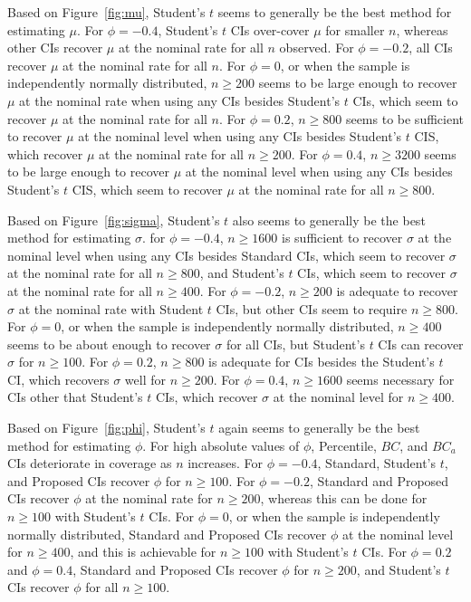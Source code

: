 \documentclass[12pt, letterpaper, titlepage]{article}
\begin{document}
Based on Figure~\ref{fig:mu}, Student's $t$ seems to generally
be the best method for estimating $\mu$.
For $\phi = -0.4$, Student's $t$ CIs over-cover 
$\mu$ for smaller $n$, whereas other CIs recover $\mu$ at the
nominal rate for all $n$ observed. For 
$\phi = -0.2$, 
all CIs recover $\mu$ at the nominal rate for all $n$. For $\phi = 0$, or when the 
sample is independently normally distributed, $n \geq 200$ seems to 
be large enough to recover $\mu$ at the nominal rate when using any CIs
 besides Student's $t$ CIs, which seem to recover $\mu$ at the nominal rate for
  all $n$.
For $\phi = 0.2$, $n \geq 800$ seems to be sufficient to recover $\mu$
at the nominal level when using
any CIs besides Student's $t$ CIS, which recover $\mu$ at the nominal
 rate for all $n \geq 200$.
For $\phi = 0.4$, $n \geq 3200$ seems to be large enough to recover $\mu$
at the nominal level when using
any CIs besides Student's $t$ CIS, which seem to recover $\mu$ at the nominal
 rate for all $n \geq 800$.


Based on Figure~\ref{fig:sigma}, Student's $t$ also seems to generally
be the best method for estimating $\sigma$.
for $\phi = -0.4$, $n \geq 1600$ is sufficient to recover $\sigma$
at the nominal level when using
any CIs besides Standard CIs, which seem to recover $\sigma$ at the nominal 
rate for all $n \geq 800$, and Student's $t$ CIs, which seem to recover $\sigma$
at the nominal rate for all $n \geq 400$. For $\phi = -0.2$, $n \geq 200$ is 
adequate to recover $\sigma$ at the nominal rate with Student $t$ CIs, 
but other CIs seem to require $n \geq 800$. For $\phi = 0$, or when the sample
is independently normally distributed, $n \geq 400$ seems to be about enough
to recover $\sigma$ for all CIs, but Student's $t$ CIs can recover $\sigma$ for
$n \geq 100$. For $\phi = 0.2$, $n \geq 800$ is adequate for CIs besides the
Student's $t$ CI, which recovers $\sigma$ well for $n \geq 200$. For 
$\phi  = 0.4$, $n \geq 1600$ seems necessary for CIs other that Student's $t$ 
CIs, which recover $\sigma$ at the nominal level for $n \geq 400$.


Based on Figure~\ref{fig:phi}, Student's $t$ again seems to generally
be the best method for estimating $\phi$. For high absolute values of $\phi$, 
Percentile, $BC$, and $BC_a$ CIs
deteriorate in coverage as $n$ increases. For $\phi = -0.4$, Standard, Student's
$t$, and Proposed CIs recover $\phi$ for $n \geq 100$. For $\phi = -0.2$, 
Standard and Proposed CIs recover $\phi$ at the nominal rate for $n \geq 200$, 
whereas this can be done for $n \geq 100$ with Student's $t$ CIs. For $\phi = 
0$, or when the sample
is independently normally distributed, Standard and Proposed CIs recover 
$\phi$ at the nominal level  for $n \geq 400$, and this is achievable for 
$n \geq 100$ with Student's $t$ CIs. For $\phi = 0.2$ and $\phi = 0.4$, Standard 
and Proposed CIs recover $\phi$ for $n \geq 200$, and Student's $t$ CIs 
recover $\phi$ for all $n \geq 100$.
\end{document}

